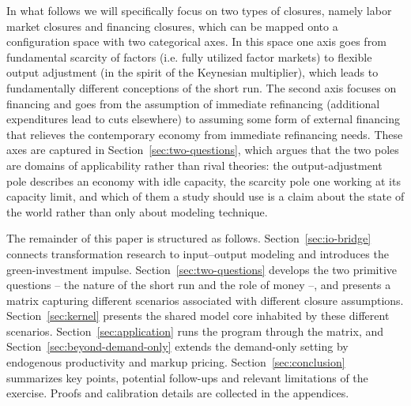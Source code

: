In what follows we will specifically focus on two types of closures, namely labor market closures and financing closures, which can be mapped onto a configuration space with two categorical axes. In this space one axis goes from fundamental scarcity of factors (i.e. fully utilized factor markets) to flexible output adjustment (in the spirit of the Keynesian multiplier), which leads to fundamentally different conceptions of the short run. The second axis focuses on financing and goes from the assumption of immediate refinancing (additional expenditures lead to cuts elsewhere) to assuming some form of external financing that relieves the contemporary economy from immediate refinancing needs. These axes are captured in Section~\ref{sec:two-questions}, which argues that the two poles are domains of applicability rather than rival theories: the output-adjustment pole describes an economy with idle capacity, the scarcity pole one working at its capacity limit, and which of them a study should use is a claim about the state of the world rather than only about modeling technique.

The remainder of this paper is structured as follows. Section~\ref{sec:io-bridge} connects transformation research to input--output modeling and introduces the green-investment impulse. Section~\ref{sec:two-questions} develops the two primitive questions -- the nature of the short run and the role of money --, and presents a matrix capturing different scenarios associated with different closure assumptions. Section~\ref{sec:kernel} presents the shared model core inhabited by these different scenarios. Section~\ref{sec:application} runs the program through the matrix, and Section~\ref{sec:beyond-demand-only} extends the demand-only setting by endogenous productivity and markup pricing. Section~\ref{sec:conclusion} summarizes key points, potential follow-ups and relevant limitations of the exercise. Proofs and calibration details are collected in the appendices.


